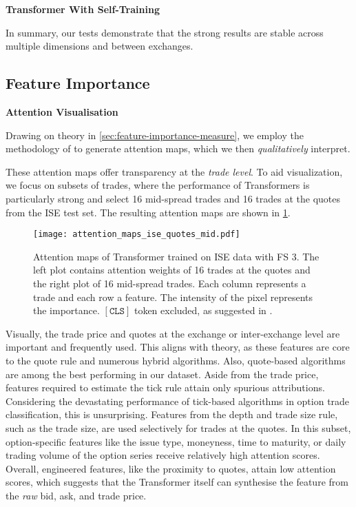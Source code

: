 \clearpage

\textbf{Transformer With Self-Training}

In summary, our tests demonstrate that the strong results are stable across multiple dimensions and between exchanges.

\clearpage

\subsection{Feature Importance}\label{sec:feature-importance}

\textbf{Attention Visualisation}

Drawing on theory in \cref{sec:feature-importance-measure}, we employ the methodology of \textcite[][2--4]{cheferTransformerInterpretabilityAttention2021} to generate attention maps, which we then \emph{qualitatively} interpret.

These attention maps offer transparency at the \emph{trade level}. To aid visualization, we focus on subsets of trades, where the performance of Transformers is particularly strong and select \num{16} mid-spread trades and \num{16} trades at the quotes from the \gls{ISE} test set. The resulting attention maps are shown in \cref{fig:attention-maps-ise}.

\begin{figure}[h!]
    \centering
    \texttt{[image: attention\_maps\_ise\_quotes\_mid.pdf]}
    \caption[Attention Maps of Transformer Trained on  Data Set]{Attention maps of Transformer trained on \gls{ISE} data with \gls{FS} 3. The left plot contains attention weights of \num{16} trades at the quotes and the right plot of \num{16} mid-spread trades. Each column represents a trade and each row a feature. The intensity of the pixel represents the importance. $\mathtt{[CLS]}$ token excluded, as suggested in \textcite[][4]{cheferGenericAttentionmodelExplainability2021}.}
    \label{fig:attention-maps-ise}
\end{figure}

Visually, the trade price and quotes at the exchange or inter-exchange level are important and frequently used. This aligns with theory, as these features are core to the quote rule and numerous hybrid algorithms. Also, quote-based algorithms are among the best performing in our dataset. Aside from the trade price, features required to estimate the tick rule attain only spurious attributions. Considering the devastating performance of tick-based algorithms in option trade classification, this is unsurprising. Features from the depth and trade size rule, such as the trade size, are used selectively for trades at the quotes. In this subset, option-specific features like the issue type, moneyness, time to maturity, or daily trading volume of the option series receive relatively high attention scores.  Overall, engineered features, like the proximity to quotes, attain low attention scores, which suggests that the Transformer itself can synthesise the feature from the \emph{raw} bid, ask, and trade price.

